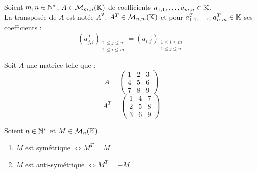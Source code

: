 \begin{definition}[Transposée]
	Soient $m, n \in \mathbb{N}^*$, $A \in \mathcal{M}_{m, n}(\mathbb{K})$ de coefficients $a_{1,1}, \ldots, a_{m,n} \in \mathbb{K}$.
	\\
	La transposée de $A$ est notée $A^T$. $A^T \in \mathcal{M}_{n,m}(\mathbb{K})$ et pour $a^T_{1,1}, \ldots, a^T_{n,m} \in \mathbb{K}$ ses coefficients :
	\[ (a^T_{j,i})_{\substack{1 \leq j \leq n \\ 1 \leq i \leq m}} = (a_{i,j})_{\substack{1 \leq i \leq m \\ 1 \leq j \leq n}} \]
\end{definition}

\begin{example}
	Soit $A$ une matrice telle que :
	\[ 
	A = 
	\begin{pmatrix}
	1 & 2 & 3 \\
	4 & 5 & 6 \\
	7 & 8 & 9
	\end{pmatrix}
	\]
	\[
	A^T =
	\begin{pmatrix}
	1 & 4 & 7 \\
	2 & 5 & 8 \\
	3 & 6 & 9
	\end{pmatrix}
	\]
\end{example}

\begin{definition}
	Soient $n \in \mathbb{N}^*$ et $M \in \mathcal{M}_n(\mathbb{K})$.
	    \begin{enumerate}
    		\item $M$ est symétrique $\iff M^T = M$
    		\item $M$ est anti-symétrique $\iff M^T = -M$
    	\end{enumerate}
\end{definition}

